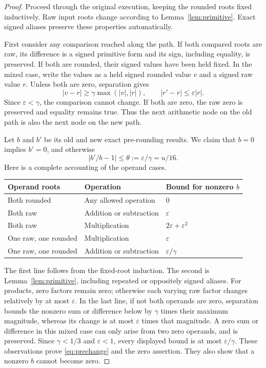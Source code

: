 \documentclass[11pt,a4paper]{article}
\theoremstyle{definition}
\theoremstyle{remark}
\newcommand{\abs}[1]{\lvert #1\rvert}
\begin{document}
\begin{proof}
Proceed through the original execution, keeping the rounded roots fixed
inductively. Raw input roots change according to Lemma~\ref{lem:primitive}.
Exact signed aliases preserve these properties automatically.

First consider any comparison reached along the path. If both compared roots
are raw, its difference is a signed primitive form and its sign, including
equality, is preserved. If both are rounded, their signed values have been
held fixed. In the mixed case, write the values as a held signed rounded
value $v$ and a signed raw value $r$. Unless both are zero, separation gives
\[
 \abs{v-r}\ge\gamma\max(\abs v,\abs r),\qquad
 \abs{r'-r}\le\varepsilon\abs r.
\]
Since $\varepsilon<\gamma$, the comparison cannot change. If both are zero,
the raw zero is preserved and equality remains true. Thus the next arithmetic
node on the old path is also the next node on the new path.

Let $b$ and $b'$ be its old and new exact pre-rounding results. We claim that
$b=0$ implies $b'=0$, and otherwise
\begin{equation}\label{eq:prechange}
 \abs{b'/b-1}\le\theta:=\varepsilon/\gamma=u/16.
\end{equation}
Here is a complete accounting of the operand cases.

\begin{center}
\begin{tabular}{@{}lll@{}}
\toprule
Operand roots & Operation & Bound for nonzero $b$\\
\midrule
Both rounded & Any allowed operation & $0$\\
Both raw & Addition or subtraction & $\varepsilon$\\
Both raw & Multiplication & $2\varepsilon+\varepsilon^2$\\
One raw, one rounded & Multiplication & $\varepsilon$\\
One raw, one rounded & Addition or subtraction & $\varepsilon/\gamma$\\
\bottomrule
\end{tabular}
\end{center}

The first line follows from the fixed-root induction. The second is
Lemma~\ref{lem:primitive}, including repeated or oppositely signed aliases.
For products, zero factors remain zero; otherwise each varying raw factor
changes relatively by at most $\varepsilon$. In the last line, if not both
operands are zero, separation bounds the nonzero sum or difference below by
$\gamma$ times their maximum magnitude, whereas its change is at most
$\varepsilon$ times that magnitude. A zero sum or difference in this mixed
case can only arise from two zero operands, and is preserved. Since
$\gamma<1/3$ and $\varepsilon<1$, every displayed bound is at most
$\varepsilon/\gamma$. These observations prove \eqref{eq:prechange} and the
zero assertion. They also show that a nonzero $b$ cannot become zero.


\end{proof}
\end{document}
